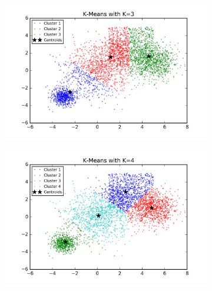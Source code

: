 \begin{description}
\begin{figure}[htb]
        \centering
        \begin{subfigure}[b]{0.475\textwidth}
            \centering
            \includegraphics[width=\textwidth]{./figures/bigClustering_kMeans_3.png}
        \end{subfigure}
        \hfill
        \begin{subfigure}[b]{0.475\textwidth}  
            \centering 
            \includegraphics[width=\textwidth]{./figures/bigClustering_kMeans_4.png}
        \end{subfigure}
        \begin{subfigure}[b]{0.475\textwidth}  
            \centering 

\end{subfigure}
\end{figure}
\end{description}
